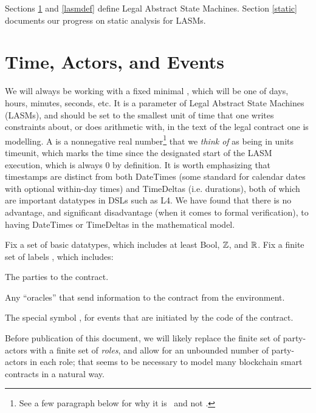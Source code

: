 \documentclass[12pt]{article}
\newcommand{\lasm}{{\sf LASM}\xspace}
\newcommand{\lasms}{{\sf LASM}s\xspace}
\newcommand{\codeactor}{\EM{\textsf{Code}}\xspace}
\newcommand{\DT}{\EM{\mathbb{D}}}
\newcommand{\TS}{\EM{\mathbb{T}}}
\begin{document}
Sections \ref{basics} and \ref{lasmdef} define Legal Abstract State Machines. Section \ref{static} documents our progress on static analysis for \lasms.

\section{Time, Actors, and Events} \label{basics}
We will always be working with a fixed minimal , which will be one of days, hours, minutes, seconds, etc. It is a parameter of Legal Abstract State Machines (\lasms), and should be set to the smallest unit of time that one writes constraints about, or does arithmetic with, in the text of the legal contract one is modelling.  A  is  a nonnegative real number\footnote{See a few paragraph below for why it is \RR\, and not \NN.} that we \textit{think of} as being in units timeunit, which marks the time since the designated start of the \lasm execution, which is always 0 by definition.
It is worth emphasizing that timestamps are distinct from both DateTimes (some standard for calendar dates with optional within-day times) and TimeDeltas (i.e. durations), both of which are important datatypes in DSLs such as L4. We have found that there is no advantage, and significant disadvantage (when it comes to formal verification), to having DateTimes or TimeDeltas in the mathematical model.

Fix a set \defstyle{$\DT$} of basic datatypes, which includes at least Bool, $\mathbb{Z}$, and $\mathbb{R}$. 
Fix a finite set of labels , which includes: 
\begin{PPI}
\item The parties to the contract.
\item Any ``oracles'' that send information to the contract from the environment.
\item The special symbol \codeactor, for events that are initiated by the code of the contract.
\end{PPI} 
Before publication of this document, we will likely replace the finite set of party-actors with a finite set of {\it roles}, and allow for an unbounded number of party-actors in each role; that seems to be necessary to model many blockchain smart contracts in a natural way.
\end{document}
